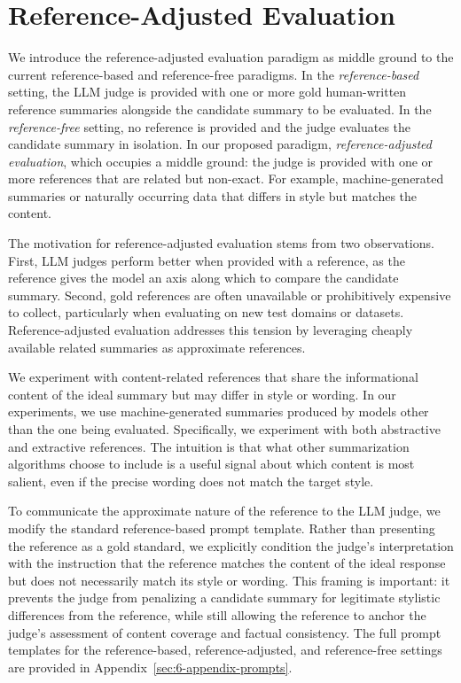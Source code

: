 \section{Reference-Adjusted Evaluation}

We introduce the reference-adjusted evaluation paradigm as middle ground to the current reference-based and reference-free paradigms. In the \textit{reference-based} setting, the LLM judge is provided with one or more gold human-written reference summaries alongside the candidate summary to be evaluated. In the \textit{reference-free} setting, no reference is provided and the judge evaluates the candidate summary in isolation. In our proposed paradigm, \textit{reference-adjusted evaluation}, which occupies a middle ground: the judge is provided with one or more references that are related but non-exact. For example, machine-generated summaries or naturally occurring data that differs in style but matches the content.

The motivation for reference-adjusted evaluation stems from two observations. 
First, LLM judges perform better when provided with a reference, as the 
reference gives the model an axis along which to compare the candidate 
summary. Second, gold references are often unavailable or prohibitively 
expensive to collect, particularly when evaluating on new test domains or 
datasets. Reference-adjusted evaluation addresses this tension by leveraging 
cheaply available related summaries as approximate references.

We experiment with content-related references that share the informational content of the ideal summary but may differ in style or wording. In our experiments, we use machine-generated summaries produced by models other than the one being evaluated. Specifically, we experiment with both 
abstractive and extractive references. The intuition is that what other summarization algorithms choose to include is a useful signal about which content is most salient, even if the precise wording does not match the target style.

To communicate the approximate nature of the reference to the LLM judge, 
we modify the standard reference-based prompt template. Rather than presenting 
the reference as a gold standard, we explicitly condition the judge's 
interpretation with the instruction that the reference matches the content 
of the ideal response but does not necessarily match its style or wording. 
This framing is important: it prevents the judge from penalizing a candidate 
summary for legitimate stylistic differences from the reference, while still 
allowing the reference to anchor the judge's assessment of content coverage 
and factual consistency. The full prompt templates for the reference-based, 
reference-adjusted, and reference-free settings are provided in 
Appendix~\ref{sec:6-appendix-prompts}.